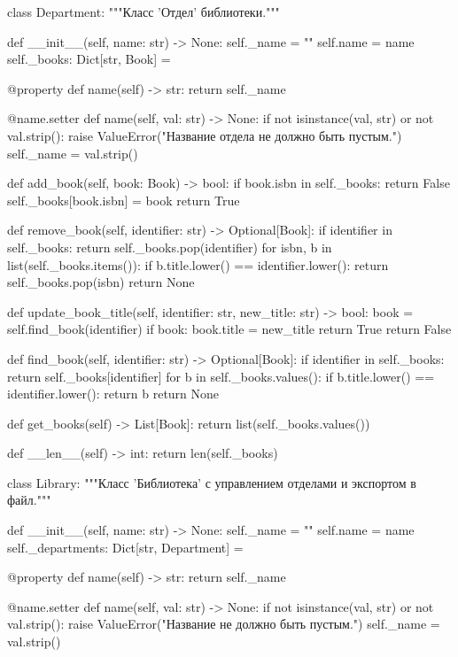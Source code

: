 \documentclass[14pt,a4paper]{extarticle}
\begin{document}
\begin{CodeListing}
class Department:
    """Класс 'Отдел' библиотеки."""

    def __init__(self, name: str) -> None:
        self._name = ""
        self.name = name
        self._books: Dict[str, Book] = {}

    @property
    def name(self) -> str:
        return self._name

    @name.setter
    def name(self, val: str) -> None:
        if not isinstance(val, str) or not val.strip():
            raise ValueError("Название отдела не должно быть пустым.")
        self._name = val.strip()

    def add_book(self, book: Book) -> bool:
        if book.isbn in self._books:
            return False
        self._books[book.isbn] = book
        return True

    def remove_book(self, identifier: str) -> Optional[Book]:
        if identifier in self._books:
            return self._books.pop(identifier)
        for isbn, b in list(self._books.items()):
            if b.title.lower() == identifier.lower():
                return self._books.pop(isbn)
        return None

    def update_book_title(self, identifier: str, new_title: str) -> bool:
        book = self.find_book(identifier)
        if book:
            book.title = new_title
            return True
        return False

    def find_book(self, identifier: str) -> Optional[Book]:
        if identifier in self._books:
            return self._books[identifier]
        for b in self._books.values():
            if b.title.lower() == identifier.lower():
                return b
        return None

    def get_books(self) -> List[Book]:
        return list(self._books.values())

    def __len__(self) -> int:
        return len(self._books)


class Library:
    """Класс 'Библиотека' с управлением отделами и экспортом в файл."""

    def __init__(self, name: str) -> None:
        self._name = ""
        self.name = name
        self._departments: Dict[str, Department] = {}

    @property
    def name(self) -> str:
        return self._name

    @name.setter
    def name(self, val: str) -> None:
        if not isinstance(val, str) or not val.strip():
            raise ValueError("Название не должно быть пустым.")
        self._name = val.strip()


\end{CodeListing}
\end{document}
